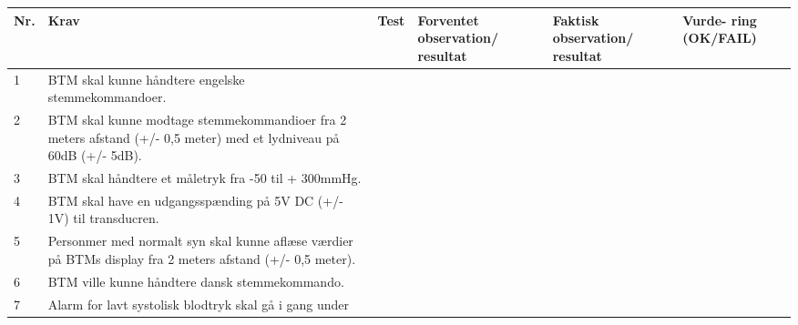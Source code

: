 \begin{table}[H]
\begin{tabular}{|p{0.5cm}|p{4cm}|p{3cm}|p{3cm}|p{3cm}|p{1cm}|}
\hline
\textbf{Nr.} & \textbf{Krav} & \textbf{Test}& \textbf{Forventet observation/ resultat}& \textbf{Faktisk observation/ resultat}& \textbf{Vurde- ring (OK/FAIL)}\\\hline
 1 & BTM skal kunne håndtere engelske stemmekommandoer. &  &  &  & \\\hline
 2 & BTM skal kunne modtage stemmekommandioer fra 2 meters afstand (+/- 0,5 meter) med et lydniveau på 60dB (+/- 5dB). &  &  &  &  \\\hline
 3 & BTM skal håndtere et måletryk fra -50 til + 300mmHg. &  & & & \\\hline
 4 & BTM skal have en udgangsspænding på 5V DC (+/- 1V) til transducren. &  & & &  \\\hline
 5 & Personmer med normalt syn skal kunne aflæse værdier på BTMs display fra 2 meters afstand (+/- 0,5 meter). & & & &  \\\hline
 6 & BTM ville kunne håndtere dansk stemmekommando. & & & & \\\hline
 7 & Alarm for lavt systolisk blodtryk skal gå i gang under 
\end{tabular}
\end{table}
